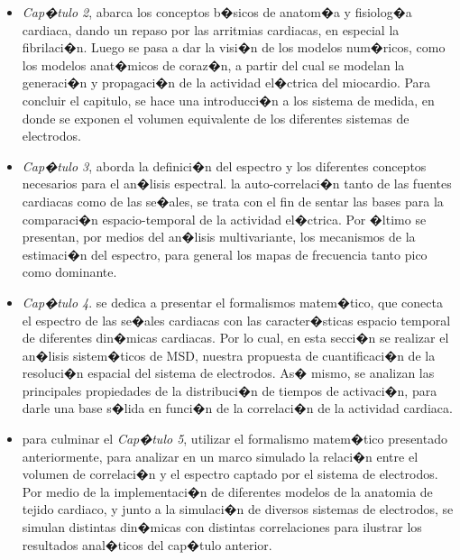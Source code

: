 \begin{itemize}
  \item \textit{Cap�tulo 2}, abarca los conceptos b�sicos de anatom�a  y
  fisiolog�a cardiaca, dando un repaso por las arritmias cardiacas, en especial
  la fibrilaci�n. Luego se pasa a dar la visi�n de los modelos num�ricos, como
  los modelos anat�micos de coraz�n, a partir del cual se modelan la
  generaci�n y propagaci�n de la actividad el�ctrica del miocardio. Para concluir
  el capitulo, se hace una introducci�n a los sistema de medida, en donde se
  exponen el volumen equivalente de los diferentes sistemas de electrodos.
  
  \item \textit{Cap�tulo 3}, aborda la definici�n del espectro  y los diferentes
  conceptos necesarios para el an�lisis espectral. la auto-correlaci�n tanto de 
  las fuentes cardiacas como de las se�ales, se trata con el fin de  sentar las
  bases para la comparaci�n espacio-temporal de la actividad el�ctrica. Por
  �ltimo se presentan, por medios del an�lisis multivariante, los mecanismos de
  la estimaci�n del espectro, para  general los mapas de frecuencia tanto pico
  como dominante. 
  
  \item \textit{Cap�tulo 4}. se dedica a presentar el formalismos matem�tico,
  que conecta el espectro de las se�ales cardiacas con las caracter�sticas 
  espacio temporal de diferentes din�micas cardiacas. Por lo cual, en esta
  secci�n se realizar el an�lisis sistem�ticos de \ac{MSD}, nuestra propuesta de
  cuantificaci�n de la resoluci�n espacial del sistema de electrodos. As� mismo,
  se analizan las principales propiedades de la distribuci�n de tiempos de
  activaci�n, para darle una base s�lida en funci�n de la correlaci�n de la
  actividad cardiaca.
  
  \item para culminar  el \textit{Cap�tulo 5}, utilizar el formalismo matem�tico
  presentado anteriormente, para analizar en un marco simulado la relaci�n entre
  el volumen de correlaci�n y el espectro captado por el sistema de electrodos.
  Por medio de la implementaci�n de diferentes modelos de la anatomia de tejido
  cardiaco, y junto a la simulaci�n de diversos sistemas de electrodos, se
  simulan distintas din�micas con distintas correlaciones  para ilustrar los
  resultados anal�ticos del cap�tulo anterior.
  
  \end{itemize}
